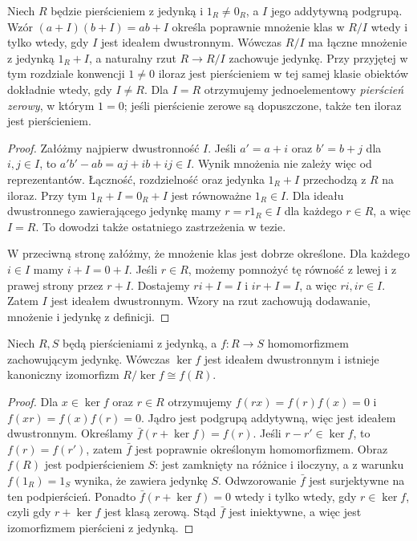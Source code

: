 \begin{twierdzenie}
\label{aa:tw:nc-quotient}
Niech $R$ będzie pierścieniem z jedynką i $1_R\ne0_R$,
a $I$ jego addytywną podgrupą. Wzór
$(a+I)(b+I)=ab+I$ określa poprawnie mnożenie
klas w $R/I$ wtedy i tylko wtedy, gdy $I$ jest
ideałem dwustronnym. Wówczas $R/I$ ma łączne
mnożenie z jedynką $1_R+I$, a naturalny rzut
$R\to R/I$ zachowuje jedynkę. Przy przyjętej
w tym rozdziale konwencji $1\ne0$ iloraz jest
pierścieniem w tej samej klasie obiektów dokładnie wtedy,
gdy $I\ne R$. Dla $I=R$ otrzymujemy jednoelementowy
\emph{pierścień zerowy}, w którym $1=0$; jeśli
pierścienie zerowe są dopuszczone, także ten iloraz
jest pierścieniem.
\end{twierdzenie}
\begin{proof}
Załóżmy najpierw dwustronność $I$. Jeśli
$a'=a+i$ oraz $b'=b+j$ dla $i,j\in I$, to
$a'b'-ab=aj+ib+ij\in I$. Wynik mnożenia nie zależy
więc od reprezentantów. Łączność, rozdzielność oraz
jedynka $1_R+I$ przechodzą z $R$ na iloraz.
Przy tym $1_R+I=0_R+I$ jest równoważne
$1_R\in I$. Dla ideału dwustronnego zawierającego
jedynkę mamy $r=r1_R\in I$ dla każdego $r\in R$,
a więc $I=R$. To dowodzi także ostatniego
zastrzeżenia w tezie.

W przeciwną stronę załóżmy, że mnożenie klas
jest dobrze określone. Dla każdego $i\in I$ mamy
$i+I=0+I$. Jeśli $r\in R$, możemy pomnożyć tę
równość z lewej i z prawej strony przez $r+I$.
Dostajemy $ri+I=I$ i $ir+I=I$, a więc $ri,ir\in I$.
Zatem $I$ jest ideałem dwustronnym. Wzory na rzut
zachowują dodawanie, mnożenie i jedynkę z definicji.
\end{proof}

\begin{twierdzenie}
\label{aa:tw:nc-first-isomorphism}
Niech $R,S$ będą pierścieniami z jedynką, a
$f:R\to S$ homomorfizmem zachowującym jedynkę.
Wówczas $\ker f$ jest ideałem dwustronnym i istnieje
kanoniczny izomorfizm $R/\ker f\cong f(R)$.
\end{twierdzenie}
\begin{proof}
Dla $x\in\ker f$ oraz $r\in R$ otrzymujemy
$f(rx)=f(r)f(x)=0$ i $f(xr)=f(x)f(r)=0$.
Jądro jest podgrupą addytywną, więc jest ideałem
dwustronnym. Określamy $\bar f(r+\ker f)=f(r)$.
Jeśli $r-r'\in\ker f$, to $f(r)=f(r')$, zatem
$\bar f$ jest poprawnie określonym homomorfizmem.
Obraz $f(R)$ jest podpierścieniem $S$: jest zamknięty
na różnice i iloczyny, a z warunku $f(1_R)=1_S$
wynika, że zawiera jedynkę $S$.
Odwzorowanie $\bar f$ jest surjektywne na ten podpierścień.
Ponadto $\bar f(r+\ker f)=0$ wtedy i tylko wtedy,
gdy $r\in\ker f$, czyli gdy $r+\ker f$ jest klasą
zerową. Stąd $\bar f$ jest iniektywne, a więc jest
izomorfizmem pierścieni z jedynką.
\end{proof}

